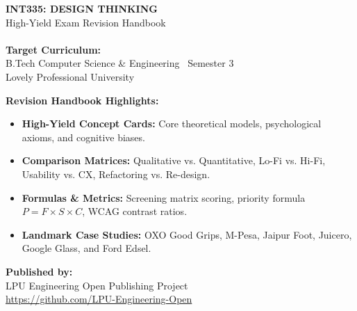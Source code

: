 \begin{titlepage}
\pagecolor{LightBg}
\begin{flushleft}
    \vspace*{1.5cm}
    {\Huge\bfseries\sffamily\color{BrandNavy} INT335: DESIGN THINKING}\\[0.4cm]
    {\LARGE\sffamily\color{BrandOrange} High-Yield Exam Revision Handbook}\\[0.8cm]
    \noindent{\color{BrandOrange}\rule{\linewidth}{2.5pt}}\\[1.2cm]
    
    {\large\sffamily\textbf{Target Curriculum:}}\\
    {\normalsize\sffamily B.Tech Computer Science \& Engineering \textbar\ Semester 3}\\
    {\normalsize\sffamily Lovely Professional University}\\[1.5cm]
    
    \begin{tcolorbox}[enhanced, colback=white, colframe=BrandNavy, boxrule=1.5pt, arc=4pt, width=0.95\linewidth]
        \sffamily\bfseries\large Revision Handbook Highlights:
        \begin{itemize}[leftmargin=1.2em, itemsep=3pt, topsep=4pt]
            \item \textbf{High-Yield Concept Cards:} Core theoretical models, psychological axioms, and cognitive biases.
            \item \textbf{Comparison Matrices:} Qualitative vs. Quantitative, Lo-Fi vs. Hi-Fi, Usability vs. CX, Refactoring vs. Re-design.
            \item \textbf{Formulas \& Metrics:} Screening matrix scoring, priority formula $P = F \times S \times C$, WCAG contrast ratios.
            \item \textbf{Landmark Case Studies:} OXO Good Grips, M-Pesa, Jaipur Foot, Juicero, Google Glass, and Ford Edsel.
        \end{itemize}
    \end{tcolorbox}
    
    \vfill
    
    {\sffamily\small\textbf{Published by:}\\
    LPU Engineering Open Publishing Project\\
    \url{https://github.com/LPU-Engineering-Open}}
\end{flushleft}
\end{titlepage}
\nopagecolor
{}
